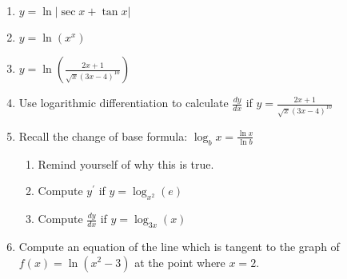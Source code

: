\documentclass[12pt]{article}
\newif\ifans
\begin{document}
\begin{enumerate}
\item $y=\ln{|\sec{x}+\tan{x}|}$

\ifans{\fbox{$\sec{x}$}} \fi

\item $y=\ln{\left(x^x\right)}$

\ifans{\fbox{$1+\ln(x)$}} \fi

\item $y=\ln{\left(\frac{2x+1}{\sqrt{x}(3x-4)^{10}}\right)}$

\ifans{\fbox{$\frac{2}{2x+1}-\frac{1}{2x}-\frac{30}{3x-4}$}} \fi

\item Use logarithmic differentiation to calculate $\frac{dy}{dx}$ if $y=\frac{2x+1}{\sqrt{x}(3x-4)^{10}}$

\ifans{\fbox{$\frac{2x+1}{\sqrt{x}(3x-4)^{10}}\left(\frac{2}{2x+1}-\frac{1}{2x}-\frac{30}{3x-4}\right)$}} \fi

\item Recall the change of base formula: $\log_{b}{x}=\frac{\ln{x}}{\ln{b}}$

\begin{enumerate}

\item Remind yourself of why this is true.

\ifans{\fbox{\parbox{1\linewidth}{Proof:  Suppose $y=\log_b{x}$.  This is equivalent to the exponential equation $b^y=x$.  Now, we take the natural log of both sides, which gives us $\ln{(b^y)}=\ln{x}$.\\
Using a property of logarithms, we see that this is equivalent to $y\ln{b}=\ln{x}$.  Finally, we solve for $y$ by dividing both sides of the equation by $\ln{b}$, a non-zero constant since $b>0$ and $b\neq 1$.\\
Thus, $y=\frac{\ln{x}}{\ln{b}}$.}}} \fi

\item Compute $y^{\prime}$ if  $y=\log_{x^2}{(e)}$

\ifans{\fbox{$-\frac{1}{2x(\ln{x})^2}$}} \fi

\item Compute $\frac{dy}{dx}$ if $y = \log_{3x}{(x)}$ 

\ifans{\fbox{$\frac{\ln{3}}{x(\ln{3x})^2}$}} \fi

\end{enumerate}

\item Compute an equation of the line which is tangent to the graph of $f(x)=\ln{(x^2-3)}$ at the point where $x=2$.


\end{enumerate}
\end{document}
